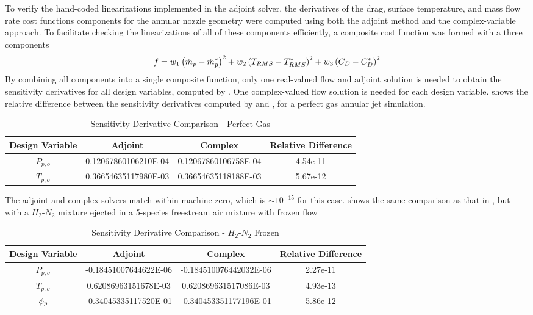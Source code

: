 To verify the hand-coded linearizations implemented in the adjoint solver, the
derivatives of the drag, surface temperature, and mass flow rate cost functions
components for the annular nozzle geometry were computed using both the adjoint
method and the complex-variable approach.  To facilitate checking the
linearizations of all of these components efficiently, a composite cost function
was formed with a three components
\begin{equation} 
  f = w_1\left( \dot{m}_p - \dot{m}_p^{*}\right)^{2} 
  + w_2\left( T_{RMS} - T_{RMS}^*\right)^2
  + w_3\left( C_{D} - C_{D}^*\right)^2
  \label{check-cost-func}
\end{equation}
By combining all components into a single composite function, only one
real-valued flow and adjoint solution is needed to obtain the sensitivity
derivatives for all design variables, computed by . One
complex-valued flow solution is needed for each design variable.
 shows the relative difference between the sensitivity
derivatives computed by  and , for a
perfect gas annular jet simulation.
\begin{table}[h]
  \centering 
  \begin{tabular}{c|c|c|c} 
    Design Variable & Adjoint & Complex & Relative Difference \\ 
    \hline 
    $P_{p,o}$ & 0.12067860106210E-04 & 0.12067860106758E-04 & 4.54e-11 \\
    $T_{p,o}$ & 0.36654635117980E-03 & 0.36654635118188E-03 & 5.67e-12 
  \end{tabular}
  \caption{Sensitivity Derivative Comparison - Perfect Gas}
  \label{tab:pg-deriv-check}
\end{table}
The adjoint and complex solvers match within machine zero, which is $\sim
10^{-15}$ for this case.   shows the same
comparison as that in , but with a $H_2$-$N_2$ mixture
ejected in a 5-species freestream air mixture with frozen flow
\begin{table}[h] 
  \centering 
  \begin{tabular}{c|c|c|c} 
    Design Variable & Adjoint & Complex & Relative Difference\\
    \hline 
    $P_{p,o}$ & -0.18451007644622E-06 & -0.184510076442032E-06 & 2.27e-11 \\ 
    $T_{p,o}$ &  0.62086963151678E-03 &  0.620869631517086E-03 & 4.93e-13 \\ 
    $\phi_p$     & -0.34045335117520E-01 & -0.340453351177196E-01 & 5.86e-12 
  \end{tabular}
  \caption{Sensitivity Derivative Comparison - $H_2$-$N_2$ Frozen}
  \label{tab:frozen-deriv-check}
\end{table}
